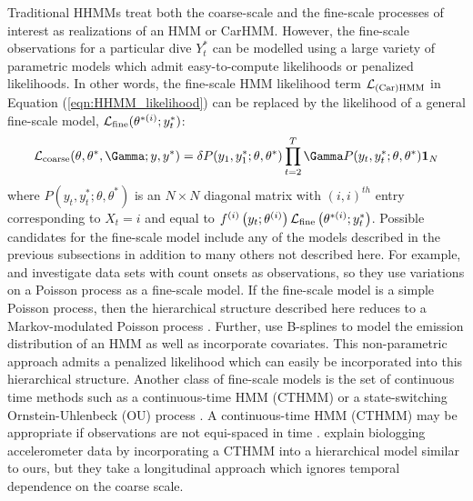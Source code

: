 Traditional HHMMs treat both the coarse-scale and the fine-scale processes of interest as realizations of an HMM or CarHMM. 
However, the fine-scale observations for a particular dive $Y^*_t$ can be modelled using a large variety of parametric models which admit easy-to-compute likelihoods or penalized likelihoods. In other words, the fine-scale HMM likelihood term $\mathcal{L}_{\text{(Car)HMM}}$ in Equation (\ref{eqn:HHMM_likelihood}) can be replaced by the likelihood of a general fine-scale model, $\mathcal{L}_{\text{fine}}(\theta^{*(i)};y^*_t)$:
\[
\calL_{\text{coarse}}(\theta,\theta^*,\Gamma;y,y^*) = \delta P(y_1,y^*_1;\theta,\theta^*) \prod_{t=2}^T \Gamma P(y_t,y^*_t;\theta,\theta^*) \mathbf{1}_N
\]
where $P(y_t,y^*_t;\theta,\theta^*) $ is an $N \times N$ diagonal matrix with $(i,i)^{th}$ entry corresponding to $X_t=i$ and equal to $f^{(i)}\left(y_t;\theta^{(i)}\right)\mathcal{L}_{\text{fine}}\left(\theta^{*(i)};y^*_t\right)$. 
%
Possible candidates for the fine-scale model include any of the models described in the previous subsections in addition to many others not described here. For example, \citet{Bebbington:2007} and \citet{Borchers:2013} investigate data sets with count onsets as observations, so they use variations on a Poisson process as a fine-scale model. If the fine-scale model is a simple Poisson process, then the hierarchical structure described here reduces to a Markov-modulated Poisson process \citep{Fischer:1993}.
Further, \citep{Langrock:2018} use B-splines to model the emission distribution of an HMM as well as incorporate covariates. This non-parametric approach admits a penalized likelihood which can easily be incorporated into this hierarchical structure. 
Another class of fine-scale models is the set of continuous time methods such as a continuous-time HMM (CTHMM) \citep{Liu:2015} or a state-switching Ornstein-Uhlenbeck (OU) process \citep{Michelot:2019}. 
A continuous-time HMM (CTHMM) may be appropriate if observations are not equi-spaced in time \citep{Liu:2015}. \citet{Xu:2018} explain biologging accelerometer data by incorporating a CTHMM into a hierarchical model similar to ours, but they take a longitudinal approach which ignores temporal dependence on the coarse scale.

